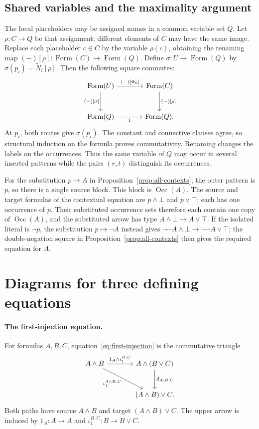 \documentclass[11pt]{article}
\newcommand{\Occ}{\operatorname{Occ}}
\newcommand{\FormulaSet}{\operatorname{Form}}
\begin{document}
\subsection{Shared variables and the maximality argument}\label{app:shared}

The local placeholders may be assigned names in a common variable
set $Q$. Let $\rho:C\to Q$ be that assignment; different elements
of $C$ may have the same image. Replace each placeholder $c\in C$
by the variable $\rho(c)$, obtaining the renaming map
$(-)[\rho]:\FormulaSet(C)\to\FormulaSet(Q)$. Define
$\sigma:U\to\FormulaSet(Q)$ by
$\sigma(p_i)=\widetilde N_i[\rho]$.
Then the following square commutes:
\begin{equation}\label{eq:app-renaming}
\begin{tikzcd}[column sep=large,row sep=large]
 \FormulaSet(U)\arrow[r,"{(-)[\Phi_0]}"]
    \arrow[d,"{(-)[\sigma]}"']
   &\FormulaSet(C)\arrow[d,"{(-)[\rho]}"]\\
 \FormulaSet(Q)\arrow[r,"1"']&\FormulaSet(Q).
\end{tikzcd}
\end{equation}
At $p_i$, both routes give $\sigma(p_i)$. The constant and connective
clauses agree, so structural induction on the formula proves commutativity.
Renaming changes the labels on the occurrences. Thus the same variable
of $Q$ may occur in several inserted patterns while the pairs $(r,t)$
distinguish its occurrences.

For the substitution $p\mapsto A$ in
Proposition~\ref{prop:all-contexts}, the outer pattern is $p$,
so there is a single source block. This block is $\Occ(A)$.
The source and target formulas of the contextual equation are
$p\wedge\bot$ and $p\vee\top$; each has one occurrence of $p$. Their substituted occurrence sets therefore each
contain one copy of $\Occ(A)$, and the substituted arrow has type
$A\wedge\bot\to A\vee\top$. If the isolated literal is $\neg p$,
the substitution $p\mapsto\neg A$ instead gives
$\neg\neg A\wedge\bot\to\neg\neg A\vee\top$; the
double-negation square in Proposition~\ref{prop:all-contexts}
then gives the required equation for $A$.

\section{Diagrams for three defining equations}
\label{app:structural-diagrams}

\paragraph{The first-injection equation.}
For formulas $A,B,C$, equation~\eqref{eq:first-injection} is the
commutative triangle
\[
\begin{tikzcd}[column sep=large,row sep=large]
 A\wedge B
   \arrow[r,"1_A\wedge\iota_1^{B,C}"]
   \arrow[dr,"{\iota_1^{A\wedge B,C}}"']
   &A\wedge(B\vee C)\arrow[d,"d_{A,B,C}"]\\
   &(A\wedge B)\vee C.
\end{tikzcd}
\]
Both paths have source $A\wedge B$ and target $(A\wedge B)\vee C$.
The upper arrow is induced by $1_A:A\to A$ and
$\iota_1^{B,C}:B\to B\vee C$.
\end{document}
